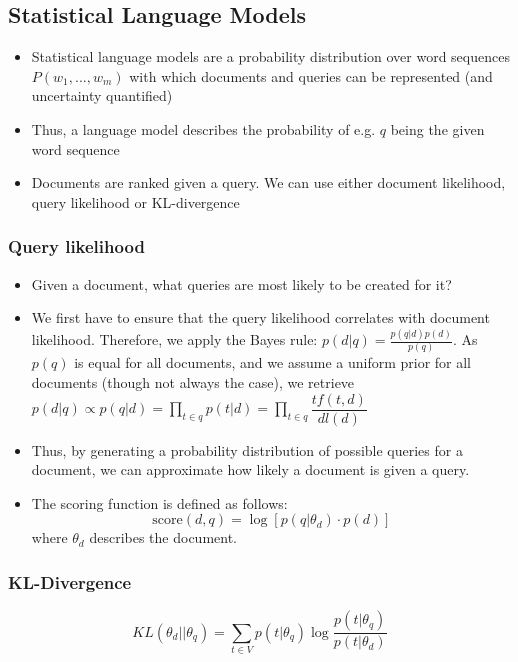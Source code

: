 \subsection{Statistical Language Models}
\begin{itemize}
	\item Statistical language models are a probability distribution over word sequences $P(w_1, ..., w_m)$ with which documents and queries can be represented (and uncertainty quantified)
	\item Thus, a language model describes the probability of e.g. $q$ being the given word sequence
	\item Documents are ranked given a query. We can use either document likelihood, query likelihood or KL-divergence
\end{itemize}
\subsubsection{Query likelihood}
\begin{itemize}
	\item Given a document, what queries are most likely to be created for it? 
	\item We first have to ensure that the query likelihood correlates with document likelihood. Therefore, we apply the Bayes rule: $p(d|q) = \frac{p(q|d)p(d)}{p(q)}$. As $p(q)$ is equal for all documents, and we assume a uniform prior for all documents (though not always the case), we retrieve $p(d|q)\propto p(q|d) = \prod_{t \in q} p(t|d) = \prod_{t \in q} \dfrac{tf(t,d)}{dl(d)}$
	\item Thus, by generating a probability distribution of possible queries for a document, we can approximate how likely a document is given a query.
	\item The scoring function is defined as follows:
	$$\text{score}(d,q) = \log \left[p(q|\theta_d)\cdot p(d)\right]$$
	where $\theta_d$ describes the document.
\end{itemize}
\subsubsection{KL-Divergence}
$$ KL(\theta_d || \theta_q) = \sum_{t \in V} p(t|\theta_q) \log \dfrac{p(t|\theta_q)}{p(t|\theta_d)} $$
